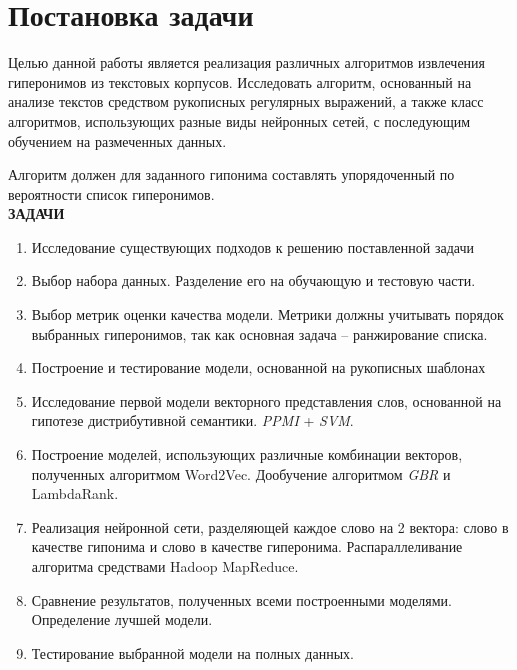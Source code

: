 \section{Постановка задачи}
\label{sec:Chapter_1} 
\large

Целью данной работы является реализация различных алгоритмов извлечения
гиперонимов из текстовых корпусов. Исследовать алгоритм, основанный на анализе
текстов средством рукописных регулярных выражений, а также класс алгоритмов,
использующих разные виды нейронных сетей, с последующим обучением на размеченных
данных.

Алгоритм должен для заданного гипонима составлять упорядоченный по вероятности
список гиперонимов.\\



\textbf{ЗАДАЧИ}

\begin{enumerate}
\item Исследование существующих подходов к решению поставленной задачи
\item Выбор набора данных. Разделение его на обучающую и тестовую части.
\item Выбор метрик оценки качества модели. Метрики должны учитывать порядок выбранных гиперонимов, так как
основная задача – ранжирование списка.
\item Построение и тестирование модели, основанной на рукописных шаблонах
\item Исследование первой модели векторного представления слов, основанной на гипотезе
дистрибутивной семантики. \textit{PPMI} + \textit{SVM}.
\item Построение моделей, использующих различные комбинации векторов, полученных
алгоритмом Word2Vec. Дообучение алгоритмом \textit{GBR} и LambdaRank.
\item Реализация нейронной сети, разделяющей каждое слово на 2 вектора: слово в
качестве гипонима и слово в качестве гиперонима. Распараллеливание алгоритма
средствами Hadoop MapReduce.
\item Сравнение результатов, полученных всеми построенными моделями. Определение лучшей модели.
\item Тестирование выбранной модели на полных данных.
\end{enumerate}

